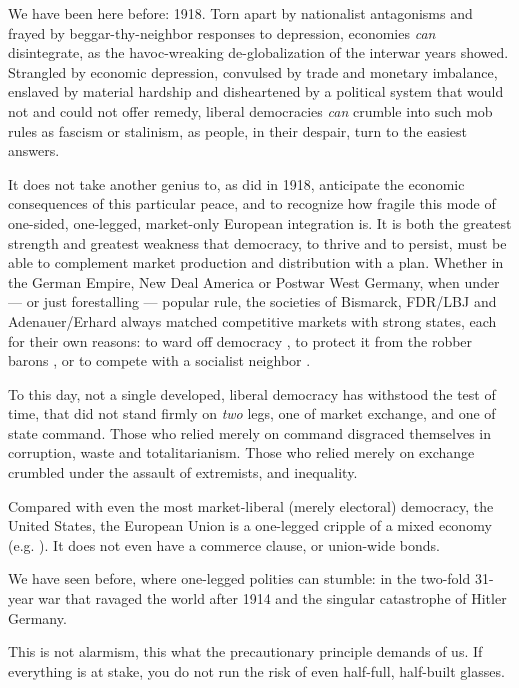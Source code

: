 \documentclass[11pt,a4paper,oneside,openright]{article}
\begin{document}
We have been here before: 
1918. 
Torn apart by nationalist antagonisms and frayed by beggar-thy-neighbor responses to depression, economies \emph{can} disintegrate, as the havoc-wreaking de-globalization of the interwar years showed. 
Strangled by economic depression, convulsed by trade and monetary imbalance, enslaved by material hardship and disheartened by a political system that would not and could not offer remedy, liberal democracies \emph{can} crumble into such mob rules as fascism or stalinism, as people, in their despair, turn to the easiest answers.

It does not take another genius to, as \cite{Keynes1936} did in 1918, anticipate the economic consequences of this particular peace, and to recognize how fragile this mode of one-sided, one-legged, market-only European integration is. 
It is both the greatest strength and greatest weakness that democracy, to thrive and to persist, must be able to complement market production and distribution with a plan. 
Whether in the German Empire, New Deal America or  Postwar West Germany, when under --- or just forestalling --- popular rule, the societies of Bismarck, FDR/LBJ and Adenauer/Erhard always matched competitive markets with strong states, each for their own reasons: 
to ward off democracy \citep{Leibfried}, to protect it from the robber barons \citep{Wapshott2011}, or to compete with a socialist neighbor \citep{Judt2006}.

To this day, not a single developed, liberal democracy has withstood the test of time, that did not stand firmly on \emph{two} legs, one of market exchange, and one of state command. 
Those who relied merely on command disgraced themselves in corruption, waste and totalitarianism. 
Those who relied merely on exchange crumbled under the assault of extremists, and inequality. 

Compared with even the most market-liberal (merely electoral) democracy, the United States, the European Union is a one-legged cripple of a mixed economy (e.g. \citealt{Bordo2011}). 
It does not even have a commerce clause, or union-wide bonds.

We have seen before, where one-legged polities can stumble: 
in the two-fold 31-year war that ravaged the world after 1914 and the singular catastrophe of Hitler Germany.

This is not alarmism, this what the precautionary principle demands of us. 
If everything is at stake, you do not run the risk of even half-full, half-built glasses.
\end{document}
